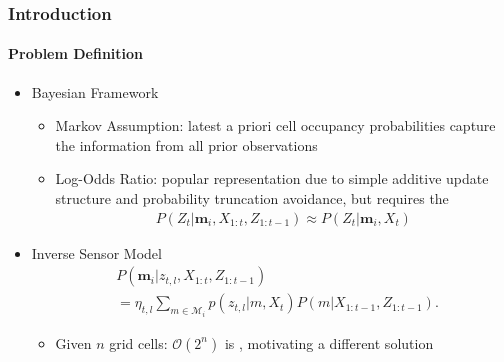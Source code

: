 \documentclass[11pt,professionalfonts,hyperref={pdftex,pdfpagemode=none,pdfstartview=FitH}]{beamer}
\renewcommand{\emph}[1]{\textit{\textbf{\color{blue}{#1}}}}
\begin{document}
\begin{frame}
\frametitle{Introduction}
\framesubtitle{Problem Definition}

\begin{itemize}
	\item Bayesian Framework
	\begin{itemize}
	\item Markov Assumption: latest a priori cell occupancy probabilities capture the information from all prior observations
	\item Log-Odds Ratio: popular representation due to simple additive update structure and probability truncation avoidance, but requires the \emph{assumption}
	\begin{align*}
		P(Z_t|\mathbf{m}_i,X_{1:t},Z_{1:t-1})\approx P(Z_t|\mathbf{m}_i,X_t)
	\end{align*}
	\end{itemize}
\vspace*{0.0cm}\pause
	\item Inverse Sensor Model
	\begin{align*}
&P(\mathbf{m}_i|z_{t,l},X_{1:t},Z_{1:t-1})\nonumber
\\
&=\eta_{t,l}\sum_{m\in\mathcal{M}_i}p(z_{t,l}|m,X_{t})P(m|X_{1:t-1},Z_{1:t-1}).
\end{align*}
	\begin{itemize}
	\item Given $n$ grid cells: $\mathcal O(2^n)$ is \emph{computationally intractable}, motivating a different solution
	\end{itemize}
\end{itemize}

\end{frame}
\end{document}
